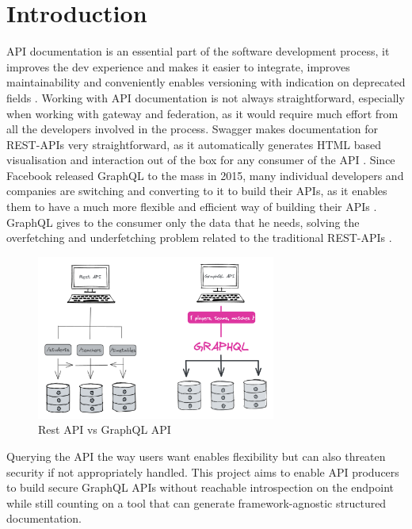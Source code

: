\section*{Introduction}
\label{s:Introduction}
API documentation is an essential part of the software development process, it
improves the dev experience and makes it easier to integrate, improves
maintainability and conveniently enables versioning with indication on
deprecated fields \citep{fanWhyAPIDocumentation2021}. Working with API
documentation is not always straightforward, especially when working with
gateway and federation, as it would require much effort from all the developers
involved in the process. Swagger makes documentation for REST-APIs very
straightforward, as it automatically generates HTML based visualisation and
interaction out of the box for any consumer of the API
\citep{korenExploitationOpenAPIDocumentation2018}. Since Facebook released
GraphQL to the mass in 2015, many individual developers and companies are
switching and converting to it to build their APIs, as it enables them to have a
much more flexible and efficient way of building their APIs
\citep{britoRESTVsGraphQL2020}. GraphQL gives to the consumer only the data that
he needs, solving the overfetching and underfetching problem related to the
traditional REST-APIs \citep{witternGeneratingGraphQLWrappersREST2018}.
\begin{figure}[H]
  \centering
  \includegraphics[width=0.7\textwidth]{figures/restvsgraph}
  \caption{Rest API vs GraphQL API}
  \label{f:restvsgraph}
\end{figure}
Querying the API the way users want enables flexibility but can also threaten
security if not appropriately handled. This project aims to enable API producers
to build secure GraphQL APIs without reachable introspection on the endpoint
while still counting on a tool that can generate framework-agnostic structured
documentation.


